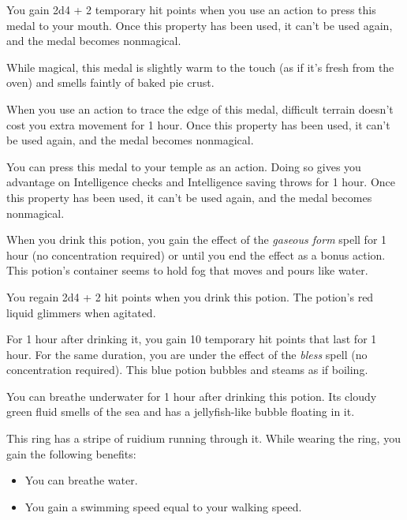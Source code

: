 \documentclass[10pt,a4paper,twoside,fancy,bg=print,twocolumn,openany,nodeprecatedcode]{dndbook}
\begin{document}
You gain 2d4 + 2 temporary hit points when you use an action to press this medal to your mouth. Once this property has been used, it can't be used again, and the medal becomes nonmagical.

While magical, this medal is slightly warm to the touch (as if it's fresh from the oven) and smells faintly of baked pie crust.

When you use an action to trace the edge of this medal, difficult terrain doesn't cost you extra movement for 1 hour. Once this property has been used, it can't be used again, and the medal becomes nonmagical.

You can press this medal to your temple as an action. Doing so gives you advantage on Intelligence checks and Intelligence saving throws for 1 hour. Once this property has been used, it can't be used again, and the medal becomes nonmagical.

When you drink this potion, you gain the effect of the \textit{gaseous form} spell for 1 hour (no concentration required) or until you end the effect as a bonus action. This potion's container seems to hold fog that moves and pours like water.

You regain 2d4 + 2 hit points when you drink this potion. The potion's red liquid glimmers when agitated.

For 1 hour after drinking it, you gain 10 temporary hit points that last for 1 hour. For the same duration, you are under the effect of the \textit{bless} spell (no concentration required). This blue potion bubbles and steams as if boiling.

You can breathe underwater for 1 hour after drinking this potion. Its cloudy green fluid smells of the sea and has a jellyfish-like bubble floating in it.

This ring has a stripe of ruidium running through it. While wearing the ring, you gain the following benefits:


\begin{itemize}
\item You can breathe water.
\item You gain a swimming speed equal to your walking speed.
\end{itemize}
\end{document}
